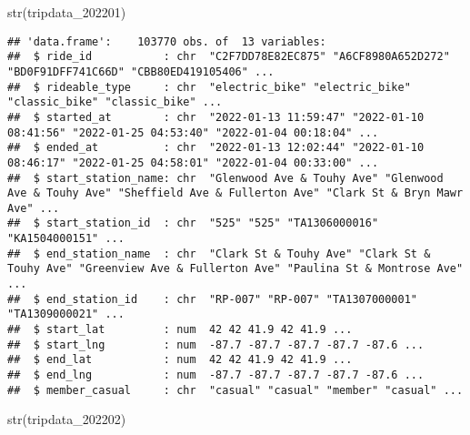 \documentclass[
]{article}
\newenvironment{Shaded}{\begin{snugshade}}{\end{snugshade}}
\newcommand{\FunctionTok}[1]{\textcolor[rgb]{0.00,0.00,0.00}{#1}}
\newcommand{\NormalTok}[1]{#1}
\begin{document}
\begin{Shaded}
\begin{Highlighting}[]
\FunctionTok{str}\NormalTok{(tripdata\_202201)}
\end{Highlighting}
\end{Shaded}

\begin{verbatim}
## 'data.frame':    103770 obs. of  13 variables:
##  $ ride_id           : chr  "C2F7DD78E82EC875" "A6CF8980A652D272" "BD0F91DFF741C66D" "CBB80ED419105406" ...
##  $ rideable_type     : chr  "electric_bike" "electric_bike" "classic_bike" "classic_bike" ...
##  $ started_at        : chr  "2022-01-13 11:59:47" "2022-01-10 08:41:56" "2022-01-25 04:53:40" "2022-01-04 00:18:04" ...
##  $ ended_at          : chr  "2022-01-13 12:02:44" "2022-01-10 08:46:17" "2022-01-25 04:58:01" "2022-01-04 00:33:00" ...
##  $ start_station_name: chr  "Glenwood Ave & Touhy Ave" "Glenwood Ave & Touhy Ave" "Sheffield Ave & Fullerton Ave" "Clark St & Bryn Mawr Ave" ...
##  $ start_station_id  : chr  "525" "525" "TA1306000016" "KA1504000151" ...
##  $ end_station_name  : chr  "Clark St & Touhy Ave" "Clark St & Touhy Ave" "Greenview Ave & Fullerton Ave" "Paulina St & Montrose Ave" ...
##  $ end_station_id    : chr  "RP-007" "RP-007" "TA1307000001" "TA1309000021" ...
##  $ start_lat         : num  42 42 41.9 42 41.9 ...
##  $ start_lng         : num  -87.7 -87.7 -87.7 -87.7 -87.6 ...
##  $ end_lat           : num  42 42 41.9 42 41.9 ...
##  $ end_lng           : num  -87.7 -87.7 -87.7 -87.7 -87.6 ...
##  $ member_casual     : chr  "casual" "casual" "member" "casual" ...
\end{verbatim}

\begin{Shaded}
\begin{Highlighting}[]
\FunctionTok{str}\NormalTok{(tripdata\_202202)}
\end{Highlighting}
\end{Shaded}
\end{document}
